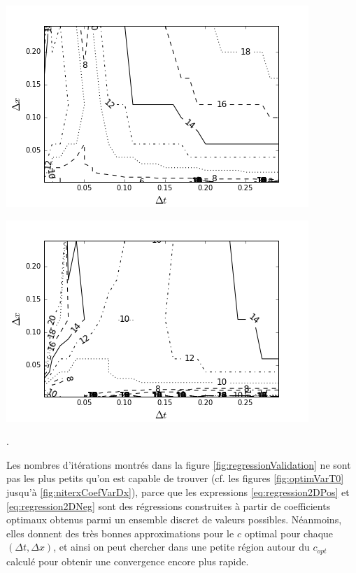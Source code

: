 \begingroup
\noindent
\begin{minipage}[t]{.45\linewidth}
	\includegraphics[scale=.45]{figures/FinalFigures/contourValidationN.png}
\end{minipage}
\hfill
\begin{minipage}[t]{.45\linewidth}
	\includegraphics[scale=.45]{figures/FinalFigures/contourValidationP.png}
\end{minipage}
.
\endgroup

\indent Les nombres d'itérations montrés dans la figure \ref{fig:regressionValidation} ne sont pas les plus petits qu'on est capable de trouver (cf. les figures \ref{fig:optimVarT0} jusqu'à \ref{fig:niterxCoefVarDx}), parce que les expressions \eqref{eq:regression2DPos} et \eqref{eq:regression2DNeg} sont des régressions construites à partir de coefficients optimaux obtenus parmi un ensemble discret de valeurs possibles. Néanmoins, elles donnent des très bonnes approximations pour le $c$ optimal pour chaque $(\Delta t, \Delta x)$, et ainsi on peut chercher dans une petite région autour du $c_{opt}$ calculé pour obtenir une convergence encore plus rapide.


